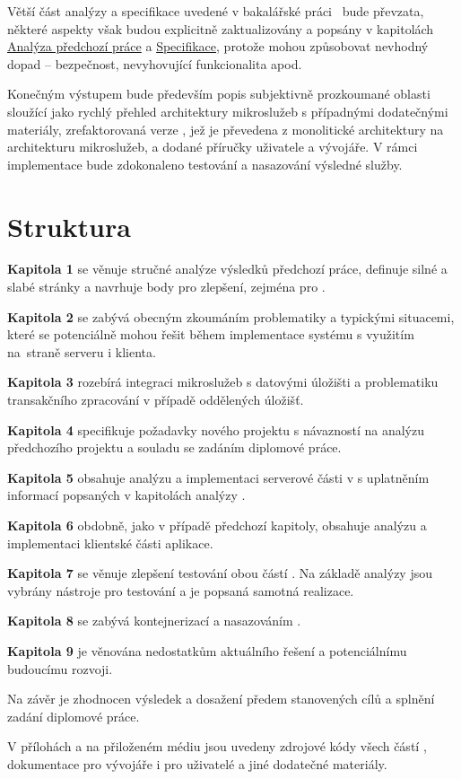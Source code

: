 Větší část analýzy a specifikace uvedené v bakalářské práci~\cite{bachelorthesis} bude převzata, některé aspekty však budou explicitně zaktualizovány a popsány v kapitolách \hyperref[ch:analysis]{Analýza předchozí práce} a \hyperref[ch:specification]{Specifikace}, protože mohou způsobovat nevhodný dopad – bezpečnost, nevyhovující funkcionalita apod.

Konečným výstupem bude především popis subjektivně prozkoumané oblasti  sloužící jako rychlý přehled architektury mikroslužeb s případnými dodatečnými materiály, zrefaktorovaná verze , jež je převedena z monolitické architektury na architekturu mikroslužeb, a dodané příručky uživatele a vývojáře.
V rámci implementace bude zdokonaleno testování a nasazování výsledné služby.


\clearpage



\section{Struktura}\label{sec:struktura}

\textbf{Kapitola 1} se věnuje stručné analýze výsledků předchozí práce, definuje silné a slabé stránky a navrhuje body pro zlepšení, zejména pro .

\textbf{Kapitola 2} se zabývá obecným zkoumáním problematiky  a typickými situacemi, které se potenciálně mohou řešit během implementace systému s využitím \\na~straně serveru i klienta.

\textbf{Kapitola 3} rozebírá integraci mikroslužeb s datovými úložišti a problematiku transakčního zpracování v případě oddělených úložišť.

\textbf{Kapitola 4} specifikuje požadavky nového projektu s návazností na analýzu předchozího projektu a souladu se zadáním diplomové práce.

\textbf{Kapitola 5} obsahuje analýzu a implementaci serverové části  v  s uplatněním informací popsaných v kapitolách analýzy .

\textbf{Kapitola 6} obdobně, jako v případě předchozí kapitoly, obsahuje analýzu a implementaci klientské části aplikace.

\textbf{Kapitola 7} se věnuje zlepšení testování obou částí .
Na základě analýzy  jsou vybrány nástroje pro testování a je popsaná samotná realizace.

\textbf{Kapitola 8} se zabývá kontejnerizací a nasazováním .

\textbf{Kapitola 9} je věnována nedostatkům aktuálního řešení a potenciálnímu budoucímu rozvoji.

Na závěr je zhodnocen výsledek a dosažení předem stanovených cílů a splnění zadání diplomové práce.

V přílohách a na přiloženém médiu jsou uvedeny zdrojové kódy všech částí , dokumentace pro vývojáře i pro uživatelé a jiné dodatečné materiály.
